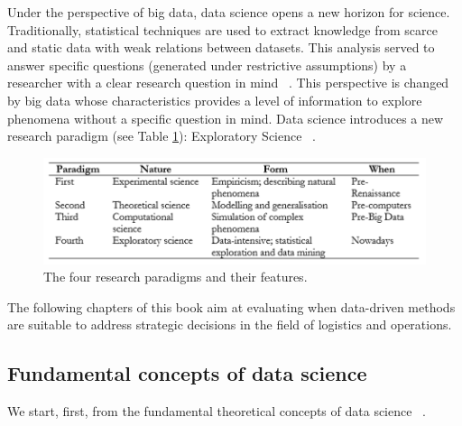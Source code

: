 Under the perspective of big data, data science opens a new horizon for science. Traditionally, statistical techniques are used to extract knowledge from scarce and static data with weak relations between datasets. This analysis served to answer specific questions (generated under restrictive assumptions) by a researcher with a clear research question in mind ~\cite{Miller2010}. This perspective is changed by big data whose characteristics provides a level of information to explore phenomena without a specific question in mind. Data science introduces a new research paradigm (see Table \ref{tab_paradigms}): Exploratory Science ~\cite{Hey2009}. 


\begin{figure}[hbt!]
\centering
\includegraphics[width=1\textwidth]{SectionIntroduction/introduction_figures/tab_paradigms.png}
\captionsetup{type=table}
\caption{The four research paradigms and their features.}
\label{tab_paradigms}
\end{figure}

The following chapters of this book aim at evaluating when data-driven methods are suitable to address strategic decisions in the field of logistics and operations.

\subsection{Fundamental concepts of data science}
We start, first, from the fundamental theoretical concepts of data science ~\cite{Provost2013}. 

